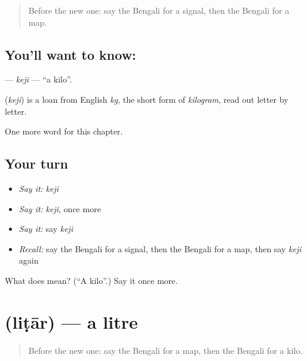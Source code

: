 \label{lesson:BN-C205-keji}



\begin{quote}
Before the new one: say the Bengali for a signal, then the Bengali for a map.
\end{quote}

\subsection*{You'll want to know: }
\textbf{} — \emph{keji} — \textquotedblleft{}a kilo\textquotedblright{}.

\begin{cousinweb}
\textbf{} (\emph{keji}) is a loan from English \emph{kg}, the short form of \emph{kilogram}, read out letter by letter.
\end{cousinweb}

\begin{grammarlens}[title={What you've built}]
One more word for this chapter.
\end{grammarlens}

\subsection*{Your turn}
\begin{itemize}
\raggedright
  \item \emph{Say it:} \emph{keji}
  \item \emph{Say it:} \emph{keji}, once more
  \item \emph{Say it:} say \emph{keji}
  \item \emph{Recall:} say the Bengali for a signal, then the Bengali for a map, then say \emph{keji} again
\end{itemize}

\begin{tcolorbox}[breakable,colback=teal!4,colframe=teal!35!black,title={Before you move on}]
What does  mean? (\textquotedblleft{}A kilo\textquotedblright{}.) Say it once more.
\end{tcolorbox}
\section[\texorpdfstring{\bn{লিটার} (liṭār)}{লিটার (liṭār)}]{ (liṭār) — a litre}

\label{lesson:BN-C205-litar}



\begin{quote}
Before the new one: say the Bengali for a map, then the Bengali for a kilo.
\end{quote}

